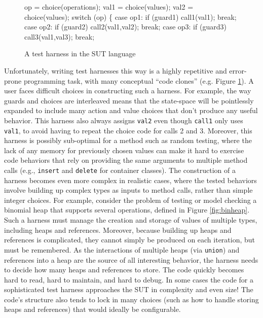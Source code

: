 \begin{figure}[t]
{\scriptsize
\begin{code}
op = choice(operations);
val1 = choice(values);
val2 = choice(values);
switch (op) \{
case op1:  if (guard1)
              call1(val1);
           break;
case op2:  if (guard2)
              call2(val1,val2);
           break;
case op3:  if (guard3)
              call3(val1,val3);
           break;
\end{code}
}
\vspace{-0.15in}
\caption {A test harness in the SUT language}
\label{fig:badharness}
\end{figure}



Unfortunately, writing test harnesses this way is a highly repetitive
and error-prone programming task, with many conceptual ``code clones''
(e.g. Figure \ref{fig:badharness}). A user faces difficult choices in
constructing such a harness. For example, the way guards and choices
are interleaved means that the state-space will be pointlessly
expanded to include many action and value choices that don't produce
any useful behavior.  This harness also always assigns {\tt val2} even
though {\tt call1} only uses {\tt val1}, to avoid having to repeat the
choice code for calls 2 and 3.  Moreover, this harness is possibly
sub-optimal for a method such as random testing, where the lack of any
memory for previously chosen values can make it hard to exercise code
behaviors that rely on providing the same arguments to multiple method
calls (e.g., {\tt insert} and {\tt delete} for container classes).
The construction of a harness becomes even more complex in realistic
cases, where the tested behaviors involve building up complex types as
inputs to method calls, rather than simple integer choices. For
example, consider the problem of testing or model checking a binomial
heap that supports several operations, defined in Figure
\ref{fig:binheap}.  Such a harness must manage the creation and
storage of values of multiple types, including heaps and references.
Moreover, because building up heaps and references is complicated,
they cannot simply be produced on each iteration, but must be
remembered.  As the interactions of multiple heaps (via {\tt union})
and references into a heap are the source of all interesting behavior,
the harness needs to decide how many heaps and references to store.
The code quickly becomes hard to read, hard to maintain, and hard to
debug.  In some cases \cite{AMAI} the code for a sophisticated test
harness approaches the SUT in complexity and even size!  The code's
structure also tends to lock in many choices (such as how to handle
storing heaps and references) that would ideally be configurable.

